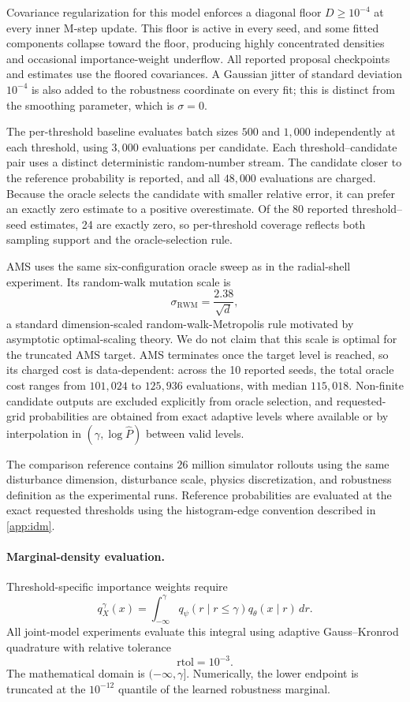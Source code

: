 Covariance regularization for this model enforces a diagonal floor $D\geq10^{-4}$ at every inner M-step update. This floor is active in every seed, and some fitted components collapse toward the floor, producing highly concentrated densities and occasional importance-weight underflow. All reported proposal checkpoints and estimates use the floored covariances. A Gaussian jitter of standard deviation $10^{-4}$ is also added to the robustness coordinate on every fit; this is distinct from the smoothing parameter, which is $\sigma=0$.

The per-threshold baseline evaluates batch sizes $500$ and $1{,}000$ independently at each threshold, using $3{,}000$ evaluations per candidate. Each threshold--candidate pair uses a distinct deterministic random-number stream. The candidate closer to the reference probability is reported, and all $48{,}000$ evaluations are charged. Because the oracle selects the candidate with smaller relative error, it can prefer an exactly zero estimate to a positive overestimate. Of the 80 reported threshold--seed estimates, 24 are exactly zero, so per-threshold coverage reflects both sampling support and the oracle-selection rule.

AMS uses the same six-configuration oracle sweep as in the radial-shell experiment. Its random-walk mutation scale is
\[
    \sigma_{\mathrm{RWM}}
    =
    \frac{2.38}{\sqrt{d}},
\]
a standard dimension-scaled random-walk-Metropolis rule motivated by asymptotic optimal-scaling theory. We do not claim that this scale is optimal for the truncated AMS target. AMS terminates once the target level is reached, so its charged cost is data-dependent: across the 10 reported seeds, the total oracle cost ranges from $101{,}024$ to $125{,}936$ evaluations, with median $115{,}018$. Non-finite candidate outputs are excluded explicitly from oracle selection, and requested-grid probabilities are obtained from exact adaptive levels where available or by interpolation in $(\gamma,\log\widehat P)$ between valid levels.

The comparison reference contains $26$ million simulator rollouts using the same disturbance dimension, disturbance scale, physics discretization, and robustness definition as the experimental runs. Reference probabilities are evaluated at the exact requested thresholds using the histogram-edge convention described in \cref{app:idm}.

\paragraph{Marginal-density evaluation.}
Threshold-specific importance weights require
\[
    q_X^\gamma(x)
    =
    \int_{-\infty}^{\gamma}
    q_\psi(r\mid r\leq\gamma)
    q_\theta(x\mid r)\,dr.
\]
All joint-model experiments evaluate this integral using adaptive Gauss--Kronrod quadrature with relative tolerance
\[
    \mathrm{rtol}=10^{-3}.
\]
The mathematical domain is $(-\infty,\gamma]$. Numerically, the lower endpoint is truncated at the $10^{-12}$ quantile of the learned robustness marginal.

